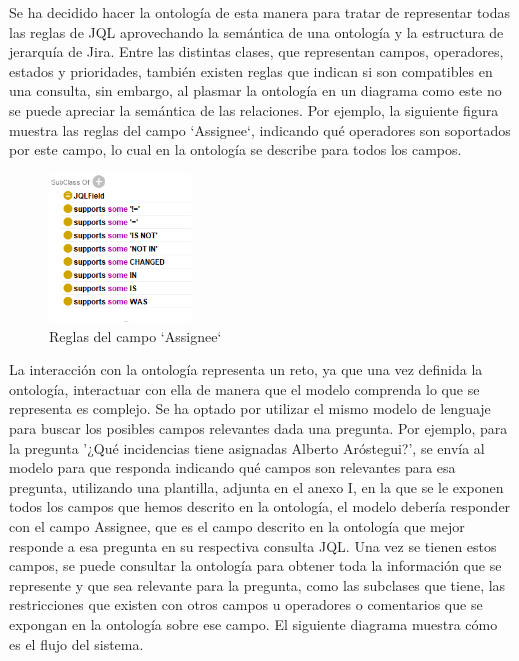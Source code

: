 Se ha decidido hacer la ontología de esta manera para tratar de representar todas las reglas de JQL aprovechando la semántica de una ontología y la estructura de jerarquía de Jira. Entre las distintas clases, que representan campos, operadores, estados y prioridades, también existen reglas que indican si son compatibles en una consulta, sin embargo, al plasmar la ontología en un diagrama como este no se puede apreciar la semántica de las relaciones. Por ejemplo, la siguiente figura muestra las reglas del campo `Assignee`, indicando qué operadores son soportados por este campo, lo cual en la ontología se describe para todos los campos.

\begin{figure}[H]
    \centering
    \includegraphics[width=0.335\textwidth]{images/supports_assignee.png}
    \caption{Reglas del campo `Assignee`}\label{fig:assignee_supports}
\end{figure}


La interacción con la ontología representa un reto, ya que una vez definida la ontología, interactuar con ella de manera que el modelo comprenda lo que se representa es complejo. Se ha optado por utilizar el mismo modelo de lenguaje para buscar los posibles campos relevantes dada una pregunta. Por ejemplo, para la pregunta '¿Qué incidencias tiene asignadas Alberto Aróstegui?', se envía al modelo para que responda indicando qué campos son relevantes para esa pregunta, utilizando una plantilla, adjunta en el anexo I, en la que se le exponen todos los campos que hemos descrito en la ontología, el modelo debería responder con el campo Assignee, que es el campo descrito en la ontología que mejor responde a esa pregunta en su respectiva consulta JQL. Una vez se tienen estos campos, se puede consultar la ontología para obtener toda la información que se represente y que sea relevante para la pregunta, como las subclases que tiene, las restricciones que existen con otros campos u operadores o comentarios que se expongan en la ontología sobre ese campo. El siguiente diagrama muestra cómo es el flujo del sistema.

